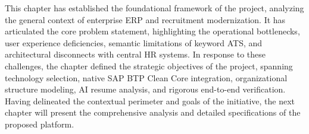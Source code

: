 This chapter has established the foundational framework of the project, analyzing the general context of enterprise ERP and recruitment modernization. It has articulated the core problem statement, highlighting the operational bottlenecks, user experience deficiencies, semantic limitations of keyword ATS, and architectural disconnects with central HR systems. In response to these challenges, the chapter defined the strategic objectives of the project, spanning technology selection, native SAP BTP Clean Core integration, organizational structure modeling, AI resume analysis, and rigorous end-to-end verification. Having delineated the contextual perimeter and goals of the initiative, the next chapter will present the comprehensive analysis and detailed specifications of the proposed platform.
